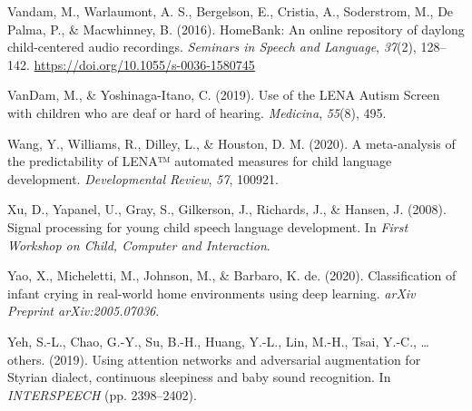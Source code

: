 \documentclass[english,,man]{apa6}
\begin{document}
\leavevmode\hypertarget{ref-vandam2016homebank}{}%
Vandam, M., Warlaumont, A. S., Bergelson, E., Cristia, A., Soderstrom, M., De Palma, P., \& Macwhinney, B. (2016). HomeBank: An online repository of daylong child-centered audio recordings. \emph{Seminars in Speech and Language}, \emph{37}(2), 128--142. \url{https://doi.org/10.1055/s-0036-1580745}

\leavevmode\hypertarget{ref-vandam2019use}{}%
VanDam, M., \& Yoshinaga-Itano, C. (2019). Use of the LENA Autism Screen with children who are deaf or hard of hearing. \emph{Medicina}, \emph{55}(8), 495.

\leavevmode\hypertarget{ref-wang2020meta}{}%
Wang, Y., Williams, R., Dilley, L., \& Houston, D. M. (2020). A meta-analysis of the predictability of LENA™ automated measures for child language development. \emph{Developmental Review}, \emph{57}, 100921.

\leavevmode\hypertarget{ref-xu2008signal}{}%
Xu, D., Yapanel, U., Gray, S., Gilkerson, J., Richards, J., \& Hansen, J. (2008). Signal processing for young child speech language development. In \emph{First Workshop on Child, Computer and Interaction}.

\leavevmode\hypertarget{ref-yao2020classification}{}%
Yao, X., Micheletti, M., Johnson, M., \& Barbaro, K. de. (2020). Classification of infant crying in real-world home environments using deep learning. \emph{arXiv Preprint arXiv:2005.07036}.

\leavevmode\hypertarget{ref-yeh2019using}{}%
Yeh, S.-L., Chao, G.-Y., Su, B.-H., Huang, Y.-L., Lin, M.-H., Tsai, Y.-C., \ldots{} others. (2019). Using attention networks and adversarial augmentation for Styrian dialect, continuous sleepiness and baby sound recognition. In \emph{INTERSPEECH} (pp. 2398--2402).

\clearpage
\renewcommand{\listfigurename}{Figure captions}
\end{document}
